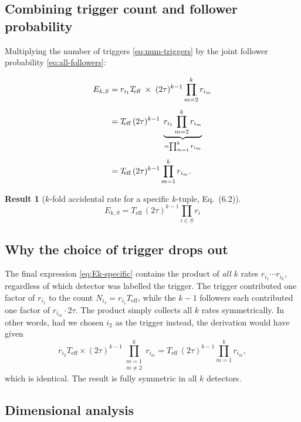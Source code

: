 \documentclass[12pt]{article}
\theoremstyle{definition}
\newtheorem{result}{Result}
\newcommand{\Teff}{T_{\!\text{eff}}}
\newcommand{\Eacc}[1]{E_{#1}}
\begin{document}
\subsection{Combining trigger count and follower probability}

Multiplying the number of triggers \eqref{eq:num-triggers} by the joint
follower probability \eqref{eq:all-followers}:

\begin{align}
    \Eacc{k,S}
        &= r_{i_1}\Teff
           \;\times\;
           (2\tau)^{k-1}\prod_{m=2}^{k} r_{i_m}
           \notag \\[4pt]
        &= \Teff\,(2\tau)^{k-1}
           \;\underbrace{r_{i_1}\prod_{m=2}^{k} r_{i_m}}_{= \prod_{m=1}^{k} r_{i_m}}
           \notag \\[4pt]
        &= \Teff\,(2\tau)^{k-1}\prod_{m=1}^{k} r_{i_m}.
        \label{eq:Ek-specific}
\end{align}

\begin{result}[$k$-fold accidental rate for a specific $k$-tuple, Eq.\ (6.2)]
\begin{equation}
    \boxed{
        \Eacc{k,S} = \Teff\,(2\tau)^{k-1}\prod_{i \in S} r_i
    }
    \tag{6.2}
\end{equation}
\end{result}

\subsection{Why the choice of trigger drops out}

The final expression \eqref{eq:Ek-specific} contains the product of
\emph{all} $k$ rates $r_{i_1}\cdots r_{i_k}$, regardless of which
detector was labelled the trigger.  The trigger contributed one factor of
$r_{i_1}$ to the count $N_{i_1} = r_{i_1}\Teff$, while the $k-1$
followers each contributed one factor of $r_{i_m}\cdot 2\tau$.  The
product simply collects all $k$ rates symmetrically.  In other words, had
we chosen $i_2$ as the trigger instead, the derivation would have given
\[
    r_{i_2}\Teff \times (2\tau)^{k-1}\prod_{\substack{m=1\\m\neq 2}}^{k} r_{i_m}
    = \Teff\,(2\tau)^{k-1}\prod_{m=1}^{k} r_{i_m},
\]
which is identical.  The result is fully symmetric in all $k$ detectors.

\subsection{Dimensional analysis}
\end{document}
